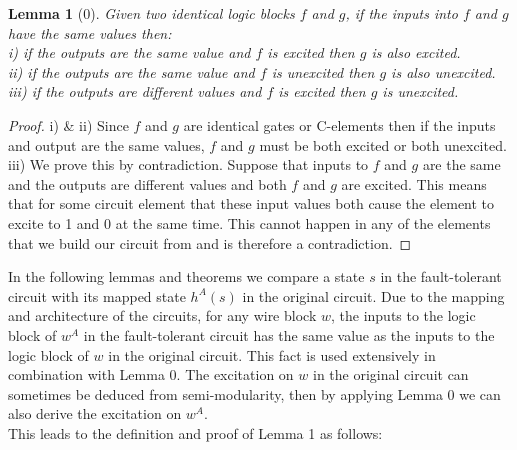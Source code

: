 \documentclass[12pt]{report}
\newtheorem*{lemma}{Lemma}
\begin{document}
\begin{lemma}[0]
Given two identical logic blocks $f$ and $g$, if the inputs into $f$ and $g$ have the same values then:\\
i)  if the outputs are the same value and $f$ is excited then $g$ is also excited.\\
ii)  if the outputs are the same value and $f$ is unexcited then $g$ is also unexcited.\\
iii)  if the outputs are different values and $f$ is excited then $g$ is unexcited.
\end{lemma}
\begin{proof}
i) \& ii)  Since $f$ and $g$ are identical gates or C-elements then if the inputs and output are the same values, $f$ and $g$ must be both excited or both unexcited. \\

iii)  We prove this by contradiction.  Suppose that inputs to $f$ and $g$ are the same and the outputs are different values and both $f$ and $g$ are excited.  This means that for some circuit element that these input values both cause the element to excite to 1 and 0 at the same time.  This cannot happen in any of the elements that we build our circuit from and is therefore a contradiction.
\end{proof}

In the following lemmas and theorems we compare a state $s$ in the fault-tolerant circuit with its mapped state $h^A(s)$ in the original circuit.  Due to the mapping and architecture of the circuits, for any wire block $w$, the inputs to the logic block of $w^A$ in the fault-tolerant circuit has the same value as the inputs to the logic block of $w$ in the original circuit.  This fact is used extensively in combination with Lemma 0.  The excitation on $w$ in the original circuit can sometimes be deduced from semi-modularity, then by applying Lemma 0 we can also derive the excitation on $w^A$.  \\



This leads to the definition and proof of Lemma 1 as follows:
\end{document}
